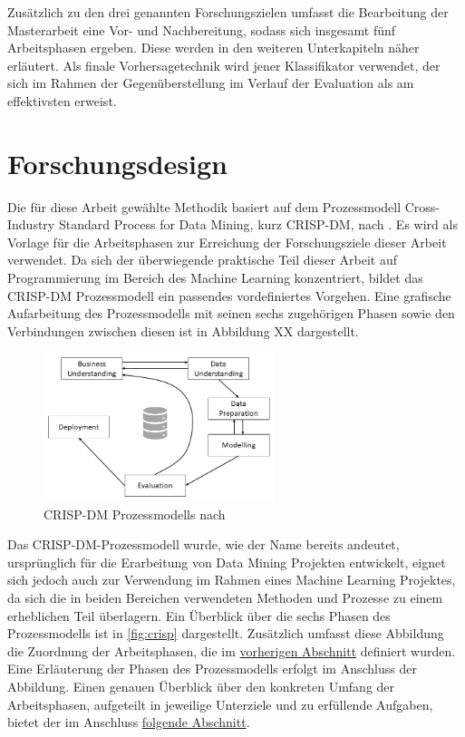 \label{phases_definition}

Zusätzlich zu den drei genannten Forschungszielen umfasst die Bearbeitung der Masterarbeit eine Vor- und Nachbereitung, sodass sich insgesamt fünf Arbeitsphasen ergeben. Diese werden in den weiteren Unterkapiteln näher erläutert. Als finale Vorhersagetechnik wird jener Klassifikator verwendet, der sich im Rahmen der Gegenüberstellung im Verlauf der Evaluation als am effektivsten erweist.

\section{Forschungsdesign}

Die für diese Arbeit gewählte Methodik basiert auf dem Prozessmodell Cross-Industry Standard Process for Data Mining, kurz CRISP-DM, nach \cite{Chapman2000}. Es wird als Vorlage für die Arbeitsphasen zur Erreichung der Forschungsziele dieser Arbeit verwendet. 
Da sich der überwiegende praktische Teil dieser Arbeit auf Programmierung im Bereich des Machine Learning konzentriert, bildet das CRISP-DM Prozessmodell ein passendes vordefiniertes Vorgehen. Eine grafische Aufarbeitung des Prozessmodells mit seinen sechs zugehörigen Phasen sowie den Verbindungen zwischen diesen ist in Abbildung XX dargestellt. 

\begin{figure}[H]
    \centering
    \includegraphics[width=0.6\textwidth]{images/CRISP-DM1}
    \caption{CRISP-DM Prozessmodells nach \cite{Chapman2000}}\label{fig:crisp1}
\end{figure}

Das CRISP-DM-Prozessmodell wurde, wie der Name bereits andeutet, ursprünglich für die Erarbeitung von Data Mining Projekten entwickelt, eignet sich jedoch auch zur Verwendung im Rahmen eines Machine Learning Projektes, da sich die in beiden Bereichen verwendeten Methoden und Prozesse zu einem erheblichen Teil überlagern. Ein Überblick über die sechs Phasen des Prozessmodells ist in \autoref{fig:crisp} dargestellt. Zusätzlich umfasst diese Abbildung die Zuordnung der Arbeitsphasen, die im \hyperref[phases_definition]{vorherigen Abschnitt} definiert wurden. Eine Erläuterung der Phasen des Prozessmodells erfolgt im Anschluss der Abbildung. Einen genauen Überblick über den konkreten Umfang der Arbeitsphasen, aufgeteilt in jeweilige Unterziele und zu erfüllende Aufgaben, bietet der im Anschluss \hyperref[timecourse] {folgende Abschnitt}. 

